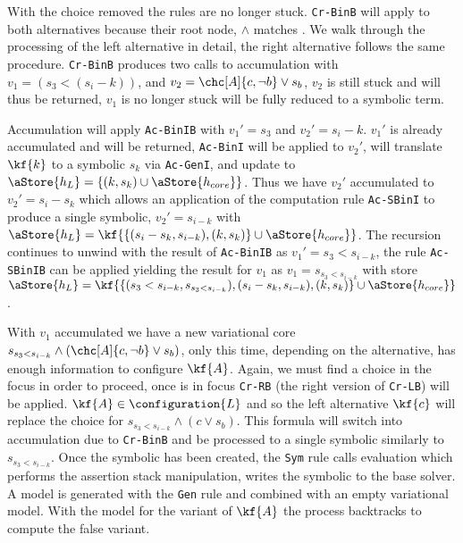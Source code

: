 With the choice removed the rules are no longer stuck. \texttt{Cr-BinB} will
apply to both alternatives because their root node, $\wedge$ matches
\boolFuncs{}. We walk through the processing of the left alternative in detail,
the right alternative follows the same procedure. \texttt{Cr-BinB} produces two
calls to accumulation with $v_{1} = (s_{3} < (s_{i} - k))$, and $v_{2} =
\chc[A]{c,\neg b} \vee s_{b}$, $v_{2}$ is still stuck and will thus be returned,
$v_{1}$ is no longer stuck will be fully reduced to a symbolic term.

Accumulation will apply \texttt{Ac-BinIB} with $v_{1}' = s_{3}$ and $v_{2}' = s_{i}
- k$. $v_{1}'$ is already accumulated and will be returned, \texttt{Ac-BinI}
will be applied to $v_{2}'$, will translate $\kf{k}$ to a symbolic $s_{k}$ via
\texttt{Ac-GenI}, and update  to $\aStore{h_{L}} = \{(k, s_{k})
\cup \aStore{h_{core}}\}$. Thus we have $v_{2}'$ accumulated to $v_{2}' = s_{i}
- s_{k}$ which allows an application of the computation rule \texttt{Ac-SBinI}
to produce a single symbolic, $v_{2}' = s_{i-k}$ with $\aStore{h_{L}} =
\kf{\{(s_{i} - s_{k}, s_{i-k}), (k,s_{k})\} \cup \aStore{h_{core}}}$. The
recursion continues to unwind with the result of \texttt{Ac-BinIB} as $v_{1}' =
s_{3} < s_{i-k}$, the rule \texttt{Ac-SBinIB} can be applied yielding the result
for $v_{1}$ as $v_{1} = s_{s_{3}<s_{i-k}}$ with store $\aStore{h_{L}} =
\kf{\{(s_{3} < s_{i-k}, s_{s_{3}<s_{i-k}}), (s_{i} - s_{k}, s_{i-k}),
  (k,s_{k})\} \cup \aStore{h_{core}}}$.

With $v_{1}$ accumulated we have a new variational core $s_{s_{3}<s_{i-k}} \wedge
(\chc[A]{c, \neg b} \vee s_{b})$, only this time, depending on the alternative,
\configuration{} has enough information to configure $\kf{A}$. Again, we must
find a choice in the focus in order to proceed, once  is in
focus \texttt{Cr-RB} (the right version of \texttt{Cr-LB}) will be applied.
$\kf{A} \in \configuration{L}$ and so the left alternative $\kf{c}$ will replace
the choice for $s_{s_{3}<s_{i-k}} \wedge (c \vee s_{b})$. This formula will
switch into accumulation due to \texttt{Cr-BinB} and be processed to a single
symbolic similarly to $s_{s_{3}<s_{i-k}}$. Once the symbolic has been created,
the \texttt{Sym} rule calls evaluation which performs the assertion stack
manipulation, writes the symbolic to the base solver. A model is generated with
the \texttt{Gen} rule and combined with an empty variational model. With the
model for the \true{} variant of $\kf{A}$ the process backtracks to compute the
false variant.

